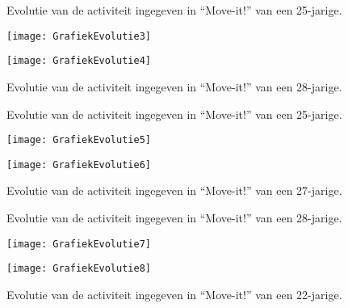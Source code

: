 \begin{figure}[htbp]
    \begin{minipage}[t]{0.48\linewidth} %
        \centering
        \caption[Evolutie van de activiteit van een 25-jarige]{Evolutie van de activiteit ingegeven in ``Move-it!'' van een 25-jarige.}
        \texttt{[image: GrafiekEvolutie3]}
        \label{fig:evolutie3}
    \end{minipage}
    \hfill
    \begin{minipage}[t]{0.48\linewidth} %
        \centering
        \caption[Evolutie van de activiteit van een 28-jarige]{Evolutie van de activiteit ingegeven in ``Move-it!'' van een 28-jarige.}
        \texttt{[image: GrafiekEvolutie4]}
        \label{fig:evolutie4}
    \end{minipage}
\end{figure}
\begin{figure}[htbp]
    \begin{minipage}[t]{0.48\linewidth} %
        \centering
        \caption[Evolutie van de activiteit van een 25-jarige]{Evolutie van de activiteit ingegeven in ``Move-it!'' van een 25-jarige.}
        \texttt{[image: GrafiekEvolutie5]}
        \label{fig:evolutie5}
    \end{minipage}
    \hfill
    \begin{minipage}[t]{0.48\linewidth} %
        \centering
        \caption[Evolutie van de activiteit van een 27-jarige]{Evolutie van de activiteit ingegeven in ``Move-it!'' van een 27-jarige.}
        \texttt{[image: GrafiekEvolutie6]}
        \label{fig:evolutie6}
    \end{minipage}
\end{figure}
\begin{figure}[htbp]
    \begin{minipage}[t]{0.48\linewidth} %
        \centering
        \caption[Evolutie van de activiteit van een 28-jarige]{Evolutie van de activiteit ingegeven in ``Move-it!'' van een 28-jarige.}
        \texttt{[image: GrafiekEvolutie7]}
        \label{fig:evolutie7}
    \end{minipage}
    \hfill
    \begin{minipage}[t]{0.48\linewidth} %
        \centering
        \caption[Evolutie van de activiteit van een 22-jarige]{Evolutie van de activiteit ingegeven in ``Move-it!'' van een 22-jarige.}
        \texttt{[image: GrafiekEvolutie8]}
        \label{fig:evolutie8}
    \end{minipage}
\end{figure}

